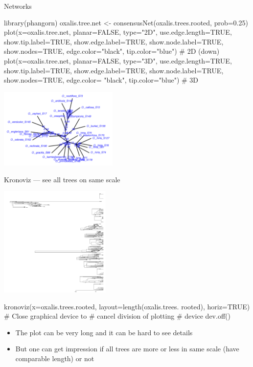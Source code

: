 \documentclass[compress, ucs, xelatex, 11pt, xcolor=svgnames,
  hyperref={
    bookmarks=true,
    unicode=true,
    colorlinks=true,
    pdftitle={Molecular data in R},
    plainpages=false,
    pdfauthor={Vojtech Zeisek},
    pdfsubject={Course about phylogeny and evolution in R},
    pdfcreator={XeLaTeX},
    pdfkeywords={R, evolution, phylogeny, molecular data},
    linkcolor=Tomato,
    anchorcolor=SaddleBrown,
    citecolor=Goldenrod,
    filecolor=DarkMagenta,
    menucolor=Sienna,
    urlcolor=DarkTurquoise,
    pdftex},
  url={hyphens, lowtilde} %
  ]{beamer}
\begin{document}
\begin{frame}[fragile]{Networks}
  \begin{spluscode}
    library(phangorn)
    oxalis.tree.net <- consensusNet(oxalis.trees.rooted, prob=0.25)
    plot(x=oxalis.tree.net, planar=FALSE, type="2D", use.edge.length=TRUE,
      show.tip.label=TRUE, show.edge.label=TRUE, show.node.label=TRUE,
      show.nodes=TRUE, edge.color="black", tip.color="blue") # 2D (down)
    plot(x=oxalis.tree.net, planar=FALSE, type="3D", use.edge.length=TRUE,
      show.tip.label=TRUE, show.edge.label=TRUE, show.node.label=TRUE,
      show.nodes=TRUE, edge.color= "black", tip.color="blue") # 3D
  \end{spluscode}
  \begin{center}
    \includegraphics[height=4cm]{oxalis-net.png}
  \end{center}
\end{frame}

\begin{frame}[fragile]{Kronoviz --- see all trees on same scale}
\begin{multicols}{2}
  \includegraphics[height=5.5cm]{kronoviz.png}
  \begin{spluscode}
    kronoviz(x=oxalis.trees.rooted,
      layout=length(oxalis.trees.
      rooted), horiz=TRUE)
    # Close graphical device to
    # cancel division of plotting
    # device
    dev.off()
  \end{spluscode}
  \vfill
  \begin{itemize}
    \item The plot can be very long and it can be hard to see details
    \item But one can get impression if all trees are more or less in same scale (have comparable length) or not
  \end{itemize}
  \vfil
\end{multicols}
\end{frame}
\end{document}
